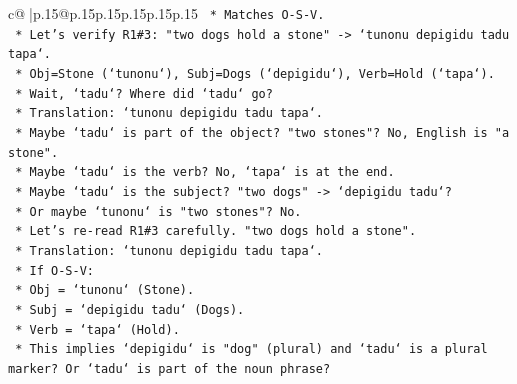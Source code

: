 \documentclass{article}
\begin{document}
{\begin{supertabular}{c@{$\;$}|p{.15\linewidth}@{}p{.15\linewidth}p{.15\linewidth}p{.15\linewidth}p{.15\linewidth}p{.15\linewidth}}
{{{\texttt{                                                                    *   Matches O{-}S{-}V.} \\
\texttt{                                                                *   Let's verify R1\#3: "two dogs hold a stone" {-}> `tunonu depigidu tadu tapa`.} \\
\texttt{                                                                    *   Obj=Stone (`tunonu`), Subj=Dogs (`depigidu`), Verb=Hold (`tapa`).} \\
\texttt{                                                                    *   Wait, `tadu`? Where did `tadu` go?} \\
\texttt{                                                                    *   Translation: `tunonu depigidu tadu tapa`.} \\
\texttt{                                                                    *   Maybe `tadu` is part of the object? "two stones"? No, English is "a stone".} \\
\texttt{                                                                    *   Maybe `tadu` is the verb? No, `tapa` is at the end.} \\
\texttt{                                                                    *   Maybe `tadu` is the subject? "two dogs" {-}> `depigidu tadu`?} \\
\texttt{                                                                    *   Or maybe `tunonu` is "two stones"? No.} \\
\texttt{                                                                    *   Let's re{-}read R1\#3 carefully. "two dogs hold a stone".} \\
\texttt{                                                                    *   Translation: `tunonu depigidu tadu tapa`.} \\
\texttt{                                                                    *   If O{-}S{-}V:} \\
\texttt{                                                                        *   Obj = `tunonu` (Stone).} \\
\texttt{                                                                        *   Subj = `depigidu tadu` (Dogs).} \\
\texttt{                                                                        *   Verb = `tapa` (Hold).} \\
\texttt{                                                                    *   This implies `depigidu` is "dog" (plural) and `tadu` is a plural marker? Or `tadu` is part of the noun phrase?} \\
}}}
\end{supertabular}}
\end{document}
